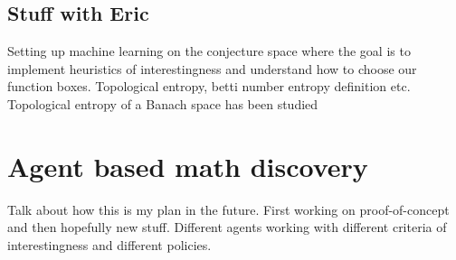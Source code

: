\subsection{Stuff with Eric}
Setting up machine learning on the conjecture space where the goal is to implement heuristics of interestingness and understand how to choose our function boxes.
Topological entropy, betti number entropy definition etc. Topological entropy of a Banach space has been studied \cite{bobokTopologicalEntropyBanach2011}

\section{Agent based math discovery}
Talk about how this is my plan in the future. First working on proof-of-concept and then hopefully new stuff.
Different agents working with different criteria of interestingness and different policies.
